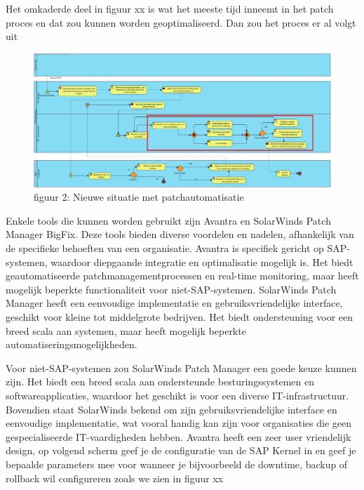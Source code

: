 \documentclass[dutch,dit,thesis]{hogentreport}
\begin{document}
 Het omkaderde deel in figuur xx is wat het meeste tijd inneemt in het patch proces en dat zou kunnen worden geoptimaliseerd. Dan zou het proces er al volgt uit


 \begin{figure}[htbp]
    \centering
    \includegraphics[width=\textwidth]{huidigesituatie2.png}
    \caption{figuur 2: Nieuwe situatie met patchautomatisatie}
     \label{fig:huidigesituatie2}
\end{figure}



 Enkele tools die kunnen worden gebruikt zijn Avantra en SolarWinds Patch Manager BigFix. Deze tools bieden diverse voordelen en nadelen, afhankelijk van de specifieke behoeften van een organisatie.
 Avantra is specifiek gericht op SAP-systemen, waardoor diepgaande integratie en optimalisatie mogelijk is. Het biedt geautomatiseerde patchmanagementprocessen en real-time monitoring, maar heeft 
 mogelijk beperkte functionaliteit voor niet-SAP-systemen.
 SolarWinds Patch Manager heeft een eenvoudige implementatie en gebruiksvriendelijke interface, geschikt voor kleine tot middelgrote bedrijven. Het biedt ondersteuning voor een breed scala aan 
 systemen, maar heeft mogelijk beperkte automatiseringsmogelijkheden.
 
 Voor niet-SAP-systemen zou SolarWinds Patch Manager een goede keuze kunnen zijn. Het biedt een breed scala aan ondersteunde besturingssystemen en softwareapplicaties, waardoor het geschikt is voor
  een diverse IT-infrastructuur. Bovendien staat SolarWinds bekend om zijn gebruiksvriendelijke interface en eenvoudige implementatie, wat vooral handig kan zijn voor organisaties die geen gespecialiseerde IT-vaardigheden hebben.
 Avantra heeft een zeer user vriendelijk design, op volgend scherm geef je de configuratie van de SAP Kernel in en geef je bepaalde parameters mee voor wanneer je bijvoorbeeld de downtime, backup of 
 rollback wil configureren zoals we zien in figuur xx
 
\end{document}
